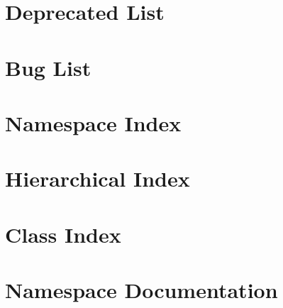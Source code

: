 \documentclass[twoside]{article}
\begin{document}
\section{Deprecated List}
\label{a00231}

\section{Bug List}
\label{a00233}

\section{Namespace Index}

\section{Hierarchical Index}

\section{Class Index}

\section{Namespace Documentation}

\end{document}
